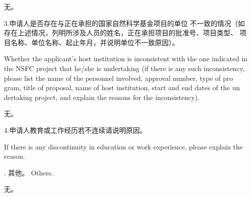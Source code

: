 \documentclass[12pt,UTF8,AutoFakeBold=4,a4paper]{ctexart}
\begin{document}
无。

{\sihao \color{MsBlue} \kaishu 3.申请人是否存在与正在承担的国家自然科学基金项目的单位
不一致的情况（如存在上述情况，列明所涉及人员的姓名，正在承担项目的批准号、项目类型、
项目名称、单位名称、起止年月，并说明单位不一致原因）。}

{\color{MsBlue} \xiaosihao {} 
Whether the applicant's host institution is inconsistent with the one indicated 
in the NSFC project that he/she is undertaking (if there is any such inconsistency, please list the name of the personnel involved, approval number, type of pro
gram, title of proposal, name of host institution, start and end dates of the un
dertaking project, and explain the reasons for the inconsistency).}

无。

{\sihao \color{MsBlue} \kaishu 4.申请人教育或工作经历若不连续请说明原因。}

{\color{MsBlue} \xiaosihao {} 
If there is any discontinuity in education or work experience, please explain 
the reason.}

{\sihao \color{MsBlue} . 其他。 
\xiaosihao {} Others.}


无。
\end{document}
